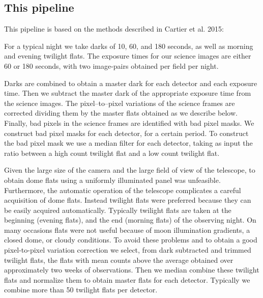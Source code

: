 \documentclass[letter, 12pt]{article}
\begin{document}
\newpage

\subsection{This pipeline}

This pipeline is based on the methods described in Cartier et al. 2015:

\vspace{0.2cm}

For a typical night we take darks of 10, 60, and 180 seconds, as well as morning and evening twilight flats. The exposure times
for our science images are either 60 or 180 seconds, with two image-pairs obtained per field per night.  

\vspace{0.05cm}

Darks are combined to obtain a master dark for each detector and each exposure time. Then we subtract the master
dark of the appropriate exposure time from the science images. The pixel--to--pixel variations of the science 
frames are corrected dividing them by the master flats obtained as we describe below. Finally, bad pixels in the science frames 
are identified with bad pixel masks. We construct bad pixel masks for each detector, for a certain period. To construct the bad pixel mask we use a median filter for each detector, taking as input the ratio between a high count twilight flat and a low count twilight flat.

\vspace{0.05cm}

Given the large size of the camera and the large field of view of the telescope, to obtain dome flats using a uniformly illuminated panel was unfeasible. Furthermore, the automatic operation of the telescope complicates a careful acquisition of dome flats. Instead twilight flats were preferred because they can be easily acquired automatically. Typically twilight flats are taken at the beginning (evening flats), and the end (morning flats) of the observing night. On many occasions flats were not useful because of moon illumination gradients, a closed dome, or cloudy conditions.
To avoid these problems and to obtain a good pixel-to-pixel variation correction we select, from dark subtracted and trimmed twilight flats, the flats with mean counts above the average obtained over approximately two weeks of observations. Then we median combine these twilight flats and normalize them to obtain master flats for each detector. Typically we combine more than 50 twilight flats per detector.   
\end{document}
